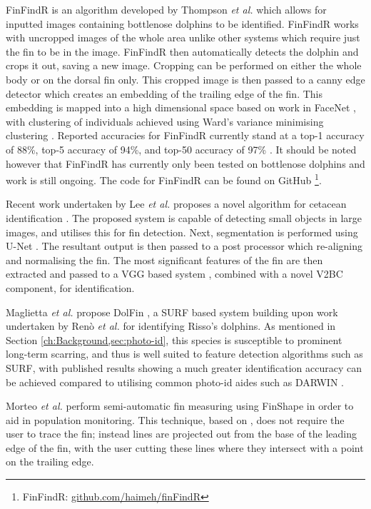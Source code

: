 FinFindR is an algorithm developed by Thompson \textit{et al.} which allows for inputted images containing bottlenose dolphins to be identified. FinFindR works with uncropped images of the whole area unlike other systems which require just the fin to be in the image. FinFindR then automatically detects the dolphin and crops it out, saving a new image. Cropping can be performed on either the whole body or on the dorsal fin only. This cropped image is then passed to a canny edge detector which creates an embedding of the trailing edge of the fin. This embedding is mapped into a high dimensional space based on work in FaceNet \cite{schroff_facenet_2015}, with clustering of individuals achieved using Ward's variance minimising clustering \cite{ward_hierarchical_1963}. Reported accuracies for FinFindR currently stand at a top-1 accuracy of 88\%, top-5 accuracy of 94\%, and top-50 accuracy of 97\% \cite{thompson_finfindrpdf_2019}. It should be noted however that FinFindR has currently only been tested on bottlenose dolphins and work is still ongoing. The code for FinFindR can be found on GitHub \footnote{FinFindR: \href{https://github.com/haimeh/finFindR}{github.com/haimeh/finFindR}}.

Recent work undertaken by Lee \textit{et al.} proposes a novel algorithm for cetacean identification \cite{lee_backbone_2020}. The proposed system is capable of detecting small objects in large images, and utilises this for fin detection. Next, segmentation is performed using U-Net \cite{ronneberger_u-net_2015}. The resultant output is then passed to a post processor which re-aligning and normalising the fin. The most significant features of the fin are then extracted and passed to a VGG based system \cite{simonyan_very_2015}, combined with a novel V2BC component, for identification. 

Maglietta \textit{et al.} propose DolFin \cite{maglietta_dolfin_2018}, a SURF based system \cite{bay_speeded-up_2008} building upon work undertaken by Renò \textit{et al.} \cite{reno_sift-based_2019} for identifying Risso's dolphins. As mentioned in Section \ref{ch:Background,sec:photo-id}, this species is susceptible to prominent long-term scarring, and thus is well suited to feature detection algorithms such as SURF, with published results showing a much greater identification accuracy can be achieved compared to utilising common photo-id aides such as DARWIN \cite{hale_unsupervised_2012}.  

Morteo \textit{et al.} \cite{morteo_phenotypic_2017} perform semi-automatic fin measuring using FinShape in order to aid in population monitoring. This technique, based on \cite{weller_global_1998}, does not require the user to trace the fin; instead lines are projected out from the base of the leading edge of the fin, with the user cutting these lines where they intersect with a point on the trailing edge. 



